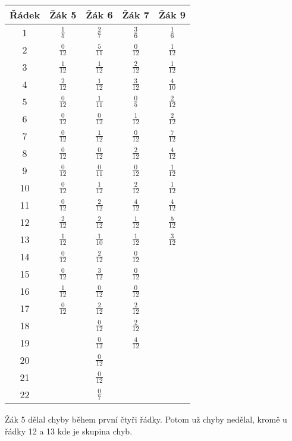 \begin{tabular}{|c|c|c|c|c|}
\hline
Řádek&Žák 5&Žák 6&Žák 7&Žák 9\\
\hline
1&$\frac{1}{5}$&$\frac{2}{7}$&$\frac{3}{6}$&$\frac{1}{6}$\\
\hline
2&$\frac{0}{12}$&$\frac{5}{11}$&$\frac{0}{12}$&$\frac{1}{12}$\\
\hline
3&$\frac{1}{12}$&$\frac{1}{12}$&$\frac{2}{12}$&$\frac{1}{12}$\\
\hline
4&$\frac{2}{12}$&$\frac{1}{12}$&$\frac{3}{12}$&$\frac{4}{10}$\\
\hline
5&$\frac{0}{12}$&$\frac{1}{11}$&$\frac{0}{5}$&$\frac{2}{12}$\\
\hline
6&$\frac{0}{12}$&$\frac{0}{12}$&$\frac{1}{12}$&$\frac{2}{12}$\\
\hline
7&$\frac{0}{12}$&$\frac{1}{12}$&$\frac{0}{12}$&$\frac{7}{12}$\\
\hline
8&$\frac{0}{12}$&$\frac{0}{12}$&$\frac{2}{12}$&$\frac{4}{12}$\\
\hline
9&$\frac{0}{12}$&$\frac{0}{11}$&$\frac{0}{12}$&$\frac{1}{12}$\\
\hline
10&$\frac{0}{12}$&$\frac{1}{12}$&$\frac{2}{12}$&$\frac{1}{12}$\\
\hline
11&$\frac{0}{12}$&$\frac{2}{12}$&$\frac{4}{12}$&$\frac{4}{12}$\\
\hline
12&$\frac{2}{12}$&$\frac{2}{12}$&$\frac{1}{12}$&$\frac{5}{12}$\\
\hline
13&$\frac{1}{12}$&$\frac{1}{10}$&$\frac{1}{12}$&$\frac{3}{12}$\\
\hline
14&$\frac{0}{12}$&$\frac{2}{12}$&$\frac{0}{12}$&\\
\hline
15&$\frac{0}{12}$&$\frac{3}{12}$&$\frac{0}{12}$&\\
\hline
16&$\frac{1}{12}$&$\frac{0}{12}$&$\frac{0}{12}$&\\
\hline
17&$\frac{0}{12}$&$\frac{2}{12}$&$\frac{2}{12}$&\\
\hline
18&&$\frac{0}{12}$&$\frac{2}{12}$&\\
\hline
19&&$\frac{0}{12}$&$\frac{4}{12}$&\\
\hline
20&&$\frac{0}{12}$&&\\
\hline
21&&$\frac{0}{12}$&&\\
\hline
22&&$\frac{0}{7}$&&\\
\hline
\end{tabular}

Žák 5 dělal chyby během první čtyři řádky.  Potom už chyby nedělal, kromě u řádky 12 a 13 kde je skupina chyb.


